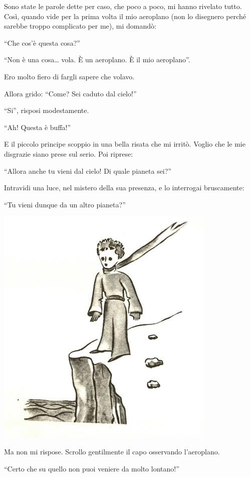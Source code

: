 \documentclass[11pt]{scrbook}
\begin{document}
Sono state le parole dette per caso, che poco a poco, mi hanno rivelato tutto. Così, quando vide per la prima volta il mio aeroplano (non lo disegnero perché sarebbe troppo complicato per me), mi domandò:

``Che cos'è questa cosa?''

``Non è una cosa\ldots{} vola. È un aeroplano. È il mio aeroplano''.

Ero molto fiero di fargli sapere che volavo.

Allora grido: ``Come? Sei caduto dal cielo!''

``Si'', risposi modestamente.

``Ah! Questa è buffa!''

E il piccolo principe scoppio in una bella risata che mi irritò. Voglio che le mie disgrazie siano prese sul serio. Poi riprese:

``Allora anche tu vieni dal cielo! Di quale pianeta sei?''

Intravidi una luce, nel mistero della sua presenza, e lo interrogai bruscamente:

``Tu vieni dunque da un altro pianeta?''

\begin{center}
\includegraphics{img/3a}
\end{center}

Ma non mi rispose. Scrollo gentilmente il capo osservando l'aeroplano.

``Certo che su quello non puoi veniere da molto lontano!''
\end{document}
